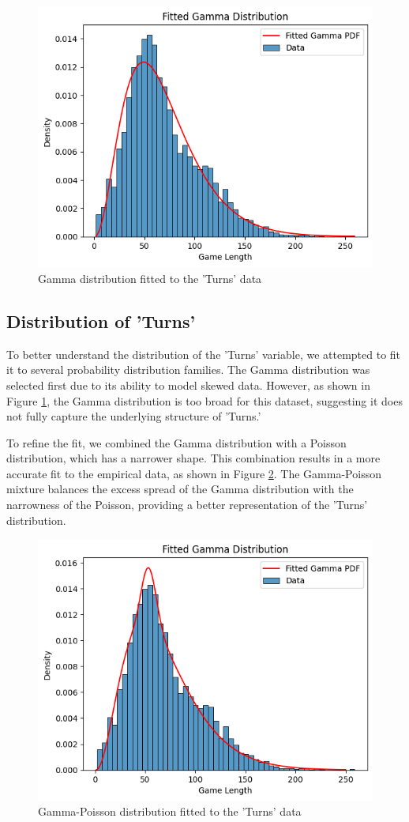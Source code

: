 \documentclass[conference]{IEEEtran}
\begin{document}
\begin{figure}[H]
    \centering
    \includegraphics[width=0.8\linewidth]{gamma_fit.png}
    \caption{Gamma distribution fitted to the 'Turns' data}
    \label{fig:gamma_fit}
\end{figure}
\subsection{Distribution of 'Turns'}

To better understand the distribution of the 'Turns' variable, we attempted to fit it to several probability distribution families. The Gamma distribution was selected first due to its ability to model skewed data. However, as shown in Figure \ref{fig:gamma_fit}, the Gamma distribution is too broad for this dataset, suggesting it does not fully capture the underlying structure of 'Turns.'

To refine the fit, we combined the Gamma distribution with a Poisson distribution, which has a narrower shape. This combination results in a more accurate fit to the empirical data, as shown in Figure \ref{fig:gam_poi_fit}. The Gamma-Poisson mixture balances the excess spread of the Gamma distribution with the narrowness of the Poisson, providing a better representation of the 'Turns' distribution.



\begin{figure}[H]
    \centering
    \includegraphics[width=0.8\linewidth]{gam_poi_fit.png}
    \caption{Gamma-Poisson distribution fitted to the 'Turns' data}
    \label{fig:gam_poi_fit}
\end{figure}
\end{document}
